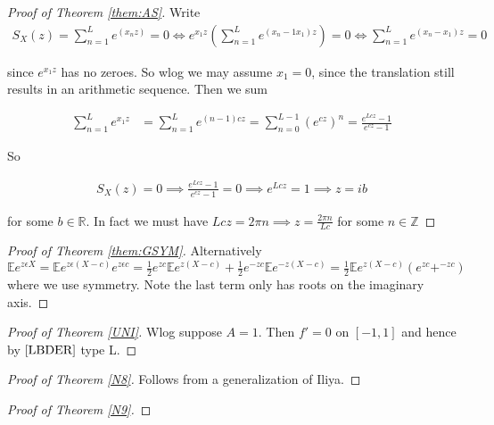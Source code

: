 \documentclass[10pt]{article}
\newcommand{\E}{\mathbb{E}}
\newcommand{\1}{\textbf{1}}
\newcommand{\R}{\mathbb{R}}
\newcommand{\Z}{\mathbb{Z}}
\theoremstyle{remark}
\theoremstyle{definition}
\begin{document}
\begin{proof}[Proof of Theorem \ref{them:AS}]
 Write 
	\begin{align*}
		S_X(z) = \sum_{n=1}^L e^(x_n z) = 0 \iff e^{x_1z}(\sum_{n=1}^L e^{(x_n-1x_1)z}) = 0 \iff \sum_{n=1}^L e^{(x_n-x_1)z} = 0
	\end{align*}

	since $e^{x_1z}$ has no zeroes. So wlog we may assume $x_1 = 0$, since the translation still results in an arithmetic sequence. Then we sum

	\begin{align*}
		\sum_{n=1}^L e^{x_1 z} &= \sum_{n=1}^L e^{(n-1)cz} = \sum_{n=0}^{L-1}(e^{cz})^{n} = \frac{e^{Lcz}-1}{e^{cz}-1}
	\end{align*}

	So 

	\begin{align*}
		S_X(z) = 0 \implies \frac{e^{Lcz}-1}{e^{cz}-1} = 0 \implies e^{Lcz} = 1 \implies z = ib
	\end{align*}

	for some $b \in \R$. In fact we must have $Lcz = 2\pi n \implies z = \frac{2 \pi n}{L c}$ for some $n \in \Z$
\end{proof} 

\begin{proof}[Proof of Theorem \ref{them:GSYM}]

	Alternatively $\E e^{z \epsilon X} = \E e^{z\epsilon (X-c)}e^{z\epsilon c} = \frac{1}{2}e^{zc}\E e^{z(X-c)}+\frac{1}{2}e^{-zc}\E e^{-z(X-c)} = \frac{1}{2}\E e^{z(X-c)}(e^{zc}+^{-zc})$ where we use symmetry. Note the last term only has roots on the imaginary axis.
\end{proof}


\begin{proof}[Proof of Theorem \ref{UNI}]
	Wlog suppose $A = 1$. Then $f' = 0$ on $[-1,1]$ and hence by $\ref{LBDER}$ type L.
\end{proof}

\begin{proof}[Proof of Theorem \ref{N8}]
	Follows from a generalization of Iliya.
\end{proof}

\begin{proof}[Proof of Theorem \ref{N9}]
	
\end{proof}
\end{document}
